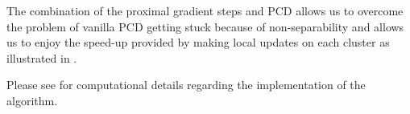 The combination of the proximal gradient steps and PCD allows us to overcome the problem of vanilla PCD getting stuck because of non-separability and allows us to enjoy the speed-up provided by making local updates on each cluster as illustrated in .

\begin{algorithm}[h!]
  \caption{%
    Hybrid coordinate descent and proximal gradient descent algorithm
    for SLOPE\label{alg:hybrid}}


  \Return{\(\beta\)}
\end{algorithm}

Please see  for computational details regarding the implementation of the algorithm.

